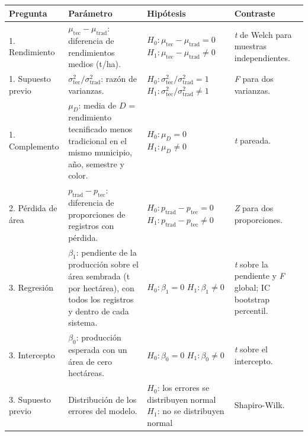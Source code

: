 \documentclass[12pt,letterpaper]{article}
\begin{document}
\begin{bloque}

\begin{apacuerpo}
\noindent\footnotesize
\setlength{\tabcolsep}{4pt}
\begin{tabular}{@{}L{2.5cm} L{4.3cm} L{4.5cm} L{4.3cm}@{}}
\hline
\textbf{Pregunta} & \textbf{Parámetro} & \textbf{Hipótesis} & \textbf{Contraste} \\
. Rendimiento & $\mu_{\text{tec}} - \mu_{\text{trad}}$: diferencia de rendimientos medios (t/ha). & $H_0\colon \mu_{\text{tec}} - \mu_{\text{trad}} = 0$ \newline $H_1\colon \mu_{\text{tec}} - \mu_{\text{trad}} \neq 0$ & \textit{t} de Welch para muestras independientes. \\
1. Supuesto previo & $\sigma^2_{\text{tec}} / \sigma^2_{\text{trad}}$: razón de varianzas. & $H_0\colon \sigma^2_{\text{tec}} / \sigma^2_{\text{trad}} = 1$ \newline $H_1\colon \sigma^2_{\text{tec}} / \sigma^2_{\text{trad}} \neq 1$ & \textit{F} para dos varianzas. \\
1. Complemento & $\mu_D$: media de $D$ = rendimiento tecnificado menos tradicional en el mismo municipio, año, semestre y color. & $H_0\colon \mu_D = 0$ \newline $H_1\colon \mu_D \neq 0$ & \textit{t} pareada. \\
2. Pérdida de área & $p_{\text{trad}} - p_{\text{tec}}$: diferencia de proporciones de registros con pérdida. & $H_0\colon p_{\text{trad}} - p_{\text{tec}} = 0$ \newline $H_1\colon p_{\text{trad}} - p_{\text{tec}} \neq 0$ & \textit{Z} para dos proporciones. \\
3. Regresión & $\beta_1$: pendiente de la producción sobre el área sembrada (t por hectárea), con todos los registros y dentro de cada sistema. & $H_0\colon \beta_1 = 0$ \newline $H_1\colon \beta_1 \neq 0$ & \textit{t} sobre la pendiente y \textit{F} global; IC bootstrap percentil. \\
3. Intercepto & $\beta_0$: producción esperada con un área de cero hectáreas. & $H_0\colon \beta_0 = 0$ \newline $H_1\colon \beta_0 \neq 0$ & \textit{t} sobre el intercepto. \\
3. Supuesto previo & Distribución de los errores del modelo. & $H_0$: los errores se distribuyen normal \newline $H_1$: no se distribuyen normal & Shapiro-Wilk. \\
\hline
\end{tabular}
\end{apacuerpo}

\end{bloque}
\end{document}
